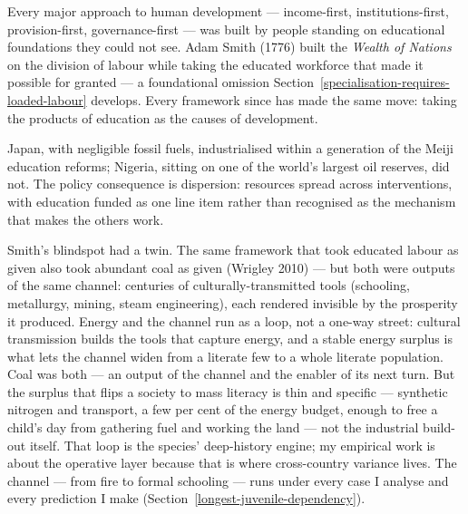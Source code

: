 \documentclass[12pt,letterpaper]{article}
\begin{document}
Every major approach to human development --- income-first,
institutions-first, provision-first, governance-first --- was built by
people standing on educational foundations they could not see. Adam
Smith (1776) built the \emph{Wealth of Nations} on the division of
labour while taking the educated workforce that made it possible for
granted --- a foundational omission
Section~\ref{specialisation-requires-loaded-labour} develops. Every
framework since has made the same move: taking the products of
education as the causes of development.

Japan, with negligible fossil fuels, industrialised within a
generation of the Meiji education reforms; Nigeria, sitting on one of
the world's largest oil reserves, did not. The policy consequence is
dispersion: resources spread across interventions, with education
funded as one line item rather than recognised as the mechanism that
makes the others work.

Smith's blindspot had a twin. The same framework that took educated
labour as given also took abundant coal as given (Wrigley 2010) ---
but both were outputs of the same channel: centuries of
culturally-transmitted tools (schooling, metallurgy, mining, steam
engineering), each rendered invisible by the prosperity it produced. Energy and the channel run as a loop, not a one-way street: cultural
transmission builds the tools that capture energy, and a stable energy
surplus is what lets the channel widen from a literate few to a whole
literate population. Coal was both --- an output of the channel and the
enabler of its next turn. But the surplus that flips a society to mass
literacy is thin and specific --- synthetic nitrogen and transport, a
few per cent of the energy budget, enough to free a child's day from
gathering fuel and working the land --- not the industrial build-out
itself. That loop is the species' deep-history engine; my empirical
work is about the operative layer because
that is where cross-country variance lives. The channel --- from fire
to formal schooling --- runs under every case I analyse and
every prediction I make (Section~\ref{longest-juvenile-dependency}).
\end{document}
